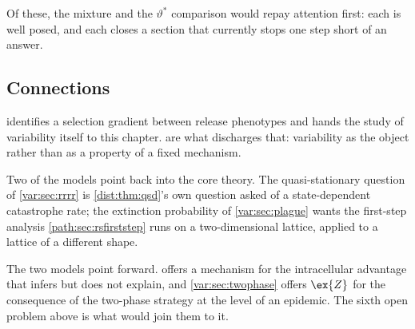 Of these, the mixture and the $\vartheta^{\ast}$ comparison would repay
attention first: each is well posed, and each closes a section that currently
stops one step short of an answer.

\subsection{Connections}
\label{var:sec:connections}

 identifies a selection gradient between release
phenotypes and hands the study of variability itself to this chapter.
 are what
discharges that: variability as the object rather than as a property of a
fixed mechanism.

Two of the models point back into the core theory. The quasi-stationary
question of \cref{var:sec:rrrr} is \cref{dist:thm:qsd}'s own question asked
of a state-dependent catastrophe rate; the extinction probability of
\cref{var:sec:plague} wants the first-step analysis
\cref{path:sec:rsfirststep} runs on a two-dimensional lattice, applied to a
lattice of a different shape.

The two \yp{} models point forward.  offers a
mechanism for the intracellular advantage that \ChPath{} infers but does not
explain, and \cref{var:sec:twophase} offers $\ex{Z}$ for the consequence of
the two-phase strategy at the level of an epidemic. The sixth open problem
above is what would join them to it.

\FloatBarrier
